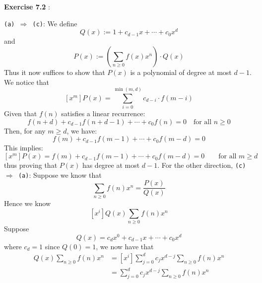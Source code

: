 \documentclass{article}
\newenvironment{solution}[1][\proofname]{
    \proof[\textbf{Solution:}] \renewcommand{\qedsymbol}{$\bell$}
}{\endproof}
\begin{document}
\newpage

\noindent \textbf{Exercise 7.2} : 

\begin{solution}
    \texttt{(a) $\Rightarrow$ (c)}: We define 
    \[ Q(x) := 1 + c_{d-1} x + \cdots + c_0 x^d \]
    and 
    \[ P(x) := \left( \sum_{n \geq 0} f(x) x^n \right) \cdot Q(x) \]
    Thus it now suffices to show that $P(x)$ is a polynomial of degree at most $d - 1$. We notice that 
    \[ [x^m] P(x) = \sum_{i = 0}^{\min(m, d)} c_{d - i} \cdot f(m - i) \]
    Given that $f(n)$ satisfies a linear recurrence:
    \[
    f(n + d) + c_{d-1} f(n + d - 1) + \cdots + c_0 f(n) = 0 \quad \text{for all } n \geq 0
    \]
    Then, for any $m \geq d$, we have:
    \[ f(m) + c_{d-1} f(m - 1) + \cdots + c_0 f(m - d) = 0 \]
    This implies:
    \[ [x^m] P(x) = f(m) + c_{d-1} f(m - 1) + \cdots + c_0 f(m - d) = 0 \qquad \text{for all } m \geq d \] 
    thus proving that $P(x)$ has degree at most $d - 1$. For the other direction, \texttt{(c) $\Rightarrow$ (a)}: Suppose we know that 
    \[ \sum_{n \geq 0} f(n) x^n = \frac{P(x)}{Q(x)} \] 
    Hence we know 
    \[ [x^i] Q(x) \sum_{n \geq 0} f(n) x^n \] 
    Suppose 
    \[ Q(x) = c_d x^0 + c_{d-1} x + \cdots + c_0 x^d \]
    where $c_d = 1$ since $Q(0) = 1$, we now have that 
    \begin{align*}
        [x^i] Q(x) \sum_{n \geq 0} f(n) x^n
        & = [x^i] \sum_{j = 0}^d c_j x^{d - j} \sum_{n \geq 0} f(n) x^n \\ 
        & = \sum_{j = 0}^d c_j x^{d - j} \sum_{n \geq 0} f(n) x^n
    \end{align*}
\end{solution}
\end{document}

